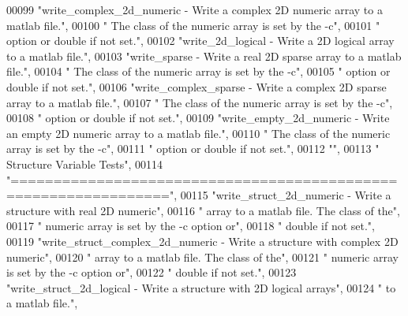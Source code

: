 \begin{DoxyCode}
00099 \textcolor{stringliteral}{"write\_complex\_2d\_numeric - Write a complex 2D numeric array to a matlab file."},
00100 \textcolor{stringliteral}{"                           The class of the numeric array is set by the -c"},
00101 \textcolor{stringliteral}{"                           option or double if not set."},
00102 \textcolor{stringliteral}{"write\_2d\_logical         - Write a 2D logical array to a matlab file."},
00103 \textcolor{stringliteral}{"write\_sparse             - Write a real 2D sparse array to a matlab file."},
00104 \textcolor{stringliteral}{"                           The class of the numeric array is set by the -c"},
00105 \textcolor{stringliteral}{"                           option or double if not set."},
00106 \textcolor{stringliteral}{"write\_complex\_sparse     - Write a complex 2D sparse array to a matlab file."},
00107 \textcolor{stringliteral}{"                           The class of the numeric array is set by the -c"},
00108 \textcolor{stringliteral}{"                           option or double if not set."},
00109 \textcolor{stringliteral}{"write\_empty\_2d\_numeric   - Write an empty 2D numeric array to a matlab file."},
00110 \textcolor{stringliteral}{"                           The class of the numeric array is set by the -c"},
00111 \textcolor{stringliteral}{"                           option or double if not set."},
00112 \textcolor{stringliteral}{""},
00113 \textcolor{stringliteral}{"    Structure Variable Tests"},
00114 \textcolor{stringliteral}{"================================================================"},
00115 \textcolor{stringliteral}{"write\_struct\_2d\_numeric         - Write a structure with real 2D numeric"},
00116 \textcolor{stringliteral}{"                                  array to a matlab file. The class of the"},
00117 \textcolor{stringliteral}{"                                  numeric array is set by the -c option or"},
00118 \textcolor{stringliteral}{"                                  double if not set."},
00119 \textcolor{stringliteral}{"write\_struct\_complex\_2d\_numeric - Write a structure with complex 2D numeric"},
00120 \textcolor{stringliteral}{"                                  array to a matlab file. The class of the"},
00121 \textcolor{stringliteral}{"                                  numeric array is set by the -c option or"},
00122 \textcolor{stringliteral}{"                                  double if not set."},
00123 \textcolor{stringliteral}{"write\_struct\_2d\_logical         - Write a structure with 2D logical arrays"},
00124 \textcolor{stringliteral}{"                                  to a matlab file."},

\end{DoxyCode}

